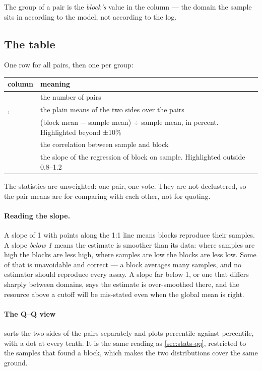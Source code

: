 The group of a pair is the \emph{block's} value in the  column — the domain the sample sits in according to the model, not according to the log.

\subsection{The table}
One row for all pairs, then one per group:

\medskip
\begin{tabularx}{\linewidth}{@{}lL@{}}\toprule
column & meaning \\ \midrule
{} & the number of pairs \\
,  & the plain means of the two sides over the pairs \\
 & (block mean − sample mean) ÷ sample mean, in percent. Highlighted beyond ±10\% \\
 & the correlation between sample and block \\
 & the slope of the regression of block on sample. Highlighted outside 0.8–1.2 \\ \bottomrule
\end{tabularx}
\medskip

The statistics are unweighted: one pair, one vote. They are not declustered, so the pair means are for comparing with each other, not for quoting.

\paragraph{Reading the slope.} A slope of 1 with points along the 1:1 line means blocks reproduce their samples. A slope \emph{below 1} means the estimate is smoother than its data: where samples are high the blocks are less high, where samples are low the blocks are less low. Some of that is unavoidable and correct — a block averages many samples, and no estimator should reproduce every assay. A slope far below 1, or one that differs sharply between domains, says the estimate is over-smoothed there, and the resource above a cutoff will be mis-stated even when the global mean is right.

\paragraph{The Q–Q view} sorts the two sides of the pairs separately and plots percentile against percentile, with a dot at every tenth. It is the same reading as \cref{sec:stats-qq}, restricted to the samples that found a block, which makes the two distributions cover the same ground.

